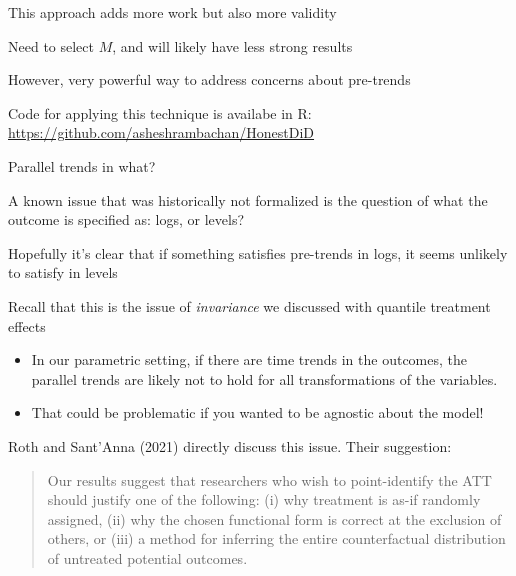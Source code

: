 \documentclass[notes,11pt, aspectratio=169]{beamer}
\newenvironment{wideitemize}{\itemize\addtolength{\itemsep}{10pt}}{\enditemize}
\begin{document}
\begin{frame}{This approach adds more work but also more validity}
  \begin{wideitemize}
  \item  Need to select $M$, and will likely have less strong results
  \item However, very powerful way to address concerns about pre-trends
  \item Code for applying this technique is availabe in R:
    \url{https://github.com/asheshrambachan/HonestDiD}
  \end{wideitemize}
\end{frame}

\begin{frame}{Parallel trends in what?}
  \begin{wideitemize}
  \item A known issue that was historically not formalized is the
    question of what the outcome is specified as: logs, or levels?
  \item Hopefully it's clear that if something satisfies pre-trends in
    logs, it seems unlikely to satisfy in levels
  \item Recall that this is the issue of \emph{invariance} we
    discussed with quantile treatment effects
    \begin{itemize}
    \item In our parametric setting, if there are time trends in the
      outcomes, the parallel trends are likely not to hold for all
      transformations of the variables.
    \item That could be problematic if you wanted to be agnostic about
      the model!
    \end{itemize}
  \item Roth and Sant'Anna (2021) directly discuss this issue. Their suggestion:
    \begin{quote}
      Our results suggest that researchers who wish to point-identify
      the ATT should justify one of the following: (i) why treatment
      is as-if randomly assigned, (ii) why the chosen functional form
      is correct at the exclusion of others, or (iii) a method for
      inferring the entire counterfactual distribution of untreated
      potential outcomes.
    \end{quote}
  \end{wideitemize}
\end{frame}
\end{document}
